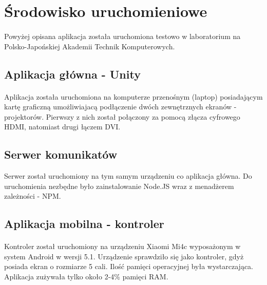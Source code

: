 \section{Środowisko uruchomieniowe}
\paragraph{}
Powyżej opisana aplikacja została uruchomiona testowo w laboratorium na Polsko-Japońskiej Akademii Technik Komputerowych.

\subsection{Aplikacja główna - Unity}
\paragraph{}
Aplikacja została uruchomiona na komputerze przenośnym (laptop) posiadającym kartę graficzną umożliwiajacą podłączenie dwóch zewnętrznych ekranów - projektorów. Pierwszy z nich został połączony za pomocą złącza cyfrowego HDMI, natomiast drugi łączem DVI.
\subsection{Serwer komunikatów}
Serwer został uruchomiony na tym samym urządzeniu co aplikacja główna. Do uruchomienia nezbędne było zainstalowanie Node.JS wraz z menadżerem zależności - NPM.
\subsection{Aplikacja mobilna - kontroler}
\paragraph{}
Kontroler został uruchomiony na urządzeniu Xiaomi Mi4c wyposażonym w system Android w wersji 5.1. Urządzenie sprawdziło się jako kontroler, gdyż posiada ekran o rozmiarze 5 cali. Ilość pamięci operacyjnej była wystarczająca. Aplikacja zużywała tylko około 2-4\% pamięci RAM. 